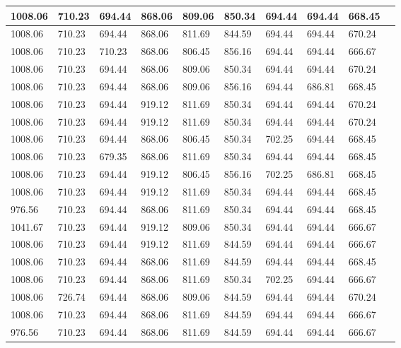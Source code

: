 \begin{longtable}{|l|l|l|l|l|l|l|l|l|l|}
		1008.06  & 710.23  & 694.44  & 868.06   & 809.06 & 850.34   & 694.44  & 694.44  & 668.45  \\ \hline
		1008.06  & 710.23  & 694.44  & 868.06   & 811.69 & 844.59   & 694.44  & 694.44  & 670.24  \\ \hline
		1008.06  & 710.23  & 710.23  & 868.06   & 806.45 & 856.16   & 694.44  & 694.44  & 666.67  \\ \hline
		1008.06  & 710.23  & 694.44  & 868.06   & 809.06 & 850.34   & 694.44  & 694.44  & 670.24  \\ \hline
		1008.06  & 710.23  & 694.44  & 868.06   & 809.06 & 856.16   & 694.44  & 686.81  & 668.45  \\ \hline
		1008.06  & 710.23  & 694.44  & 919.12   & 811.69 & 850.34   & 694.44  & 694.44  & 670.24  \\ \hline
		1008.06  & 710.23  & 694.44  & 919.12   & 811.69 & 850.34   & 694.44  & 694.44  & 670.24  \\ \hline
		1008.06  & 710.23  & 694.44  & 868.06   & 806.45 & 850.34   & 702.25  & 694.44  & 668.45  \\ \hline
		1008.06  & 710.23  & 679.35  & 868.06   & 811.69 & 850.34   & 694.44  & 694.44  & 668.45  \\ \hline
		1008.06  & 710.23  & 694.44  & 919.12   & 806.45 & 856.16   & 702.25  & 686.81  & 668.45  \\ \hline
		1008.06  & 710.23  & 694.44  & 919.12   & 811.69 & 850.34   & 694.44  & 694.44  & 668.45  \\ \hline
		976.56   & 710.23  & 694.44  & 868.06   & 811.69 & 850.34   & 694.44  & 694.44  & 668.45  \\ \hline
		1041.67  & 710.23  & 694.44  & 919.12   & 809.06 & 850.34   & 694.44  & 694.44  & 666.67  \\ \hline
		1008.06  & 710.23  & 694.44  & 919.12   & 811.69 & 844.59   & 694.44  & 694.44  & 666.67  \\ \hline
		1008.06  & 710.23  & 694.44  & 868.06   & 811.69 & 844.59   & 694.44  & 694.44  & 668.45  \\ \hline
		1008.06  & 710.23  & 694.44  & 868.06   & 811.69 & 850.34   & 702.25  & 694.44  & 666.67  \\ \hline
		1008.06  & 726.74  & 694.44  & 868.06   & 809.06 & 844.59   & 694.44  & 694.44  & 670.24  \\ \hline
		1008.06  & 710.23  & 694.44  & 868.06   & 811.69 & 844.59   & 694.44  & 694.44  & 666.67  \\ \hline
		976.56   & 710.23  & 694.44  & 868.06   & 811.69 & 844.59   & 694.44  & 694.44  & 666.67  \\ \hline

\end{longtable}
